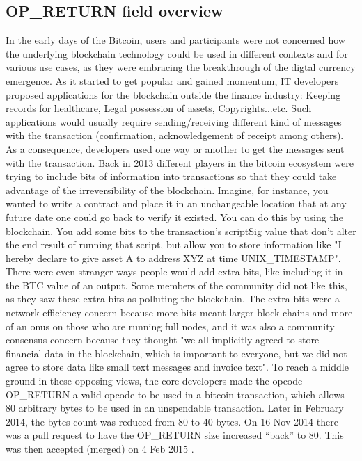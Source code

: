 \documentclass[a4paper]{article}
\begin{document}
\subsection{OP\_RETURN field overview \cite{bit}}
In the early days of the Bitcoin, users and participants were not concerned how the underlying blockchain technology could be used in different contexts and for various use cases, as they were embracing the breakthrough of the digtal currency emergence. As it started to get popular and gained momentum, IT developers proposed applications for the blockchain outside the finance industry: Keeping records for healthcare, Legal possession of assets, Copyrights...etc. Such applications would usually require sending/receiving different kind of messages with the transaction (confirmation, acknowledgement of receipt among others). As a consequence, developers used one way or another to get the messages sent with the transaction. Back in 2013 different players in the bitcoin ecosystem were trying to include bits of information into transactions so that they could take advantage of the irreversibility of the blockchain. Imagine, for instance, you wanted to write a contract and place it in an unchangeable location that at any future date one could go back to verify it existed. You can do this by using the blockchain. You add some bits to the transaction's scriptSig value that don't alter the end result of running that script, but allow you to store information like "I hereby declare to give asset A to address XYZ at time UNIX\_TIMESTAMP". There were even stranger ways people would add extra bits, like including it in the BTC value of an output. Some members of the community did not like this, as they saw these extra bits as polluting the blockchain. The extra bits were a network efficiency concern because more bits meant larger block chains and more of an onus on those who are running full nodes, and it was also a community consensus concern because they thought "we all implicitly agreed to store financial data in the blockchain, which is important to everyone, but we did not agree to store data like small text messages and invoice text". To reach a middle ground in these opposing views, the core-developers made the opcode OP\_RETURN a valid opcode to be used in a bitcoin transaction, which allows 80 arbitrary bytes to be used in an unspendable transaction. Later in February 2014, the bytes count was reduced from 80 to 40 bytes. On 16 Nov 2014 there was a pull request to have the OP\_RETURN size increased “back” to 80. This was then accepted (merged) on 4 Feb 2015 \cite{bit2}.
\end{document}
